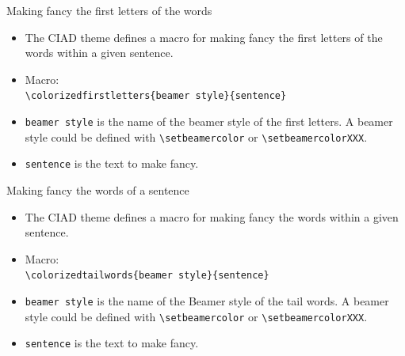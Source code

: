 \documentclass[english,sectioncirclenumberstyle]{ciadbeamer}
\begin{document}
\begin{frame}{Making fancy the first letters of the words}
	\begin{itemize}
	\item The CIAD theme defines a macro for making fancy the first letters of the words within a given sentence.
	\item Macro:\\
		\texttt{{\textbackslash}colorizedfirstletters\{beamer style\}\{sentence\}}
	\item \texttt{beamer style} is the name of the beamer style of the first letters. A beamer style could be defined with \texttt{{\textbackslash}setbeamercolor} or \texttt{{\textbackslash}setbeamercolorXXX}.
	\item \texttt{sentence} is the text to make fancy.
	\end{itemize}
	\begin{example}
	\end{example}
\end{frame}

\begin{frame}{Making fancy the words of a sentence}
	\begin{itemize}
	\item The CIAD theme defines a macro for making fancy the words within a given sentence.
	\item Macro:\\
		\texttt{{\textbackslash}colorizedtailwords\{beamer style\}\{sentence\}}
	\item \texttt{beamer style} is the name of the Beamer style of the tail words. A beamer style could be defined with \texttt{{\textbackslash}setbeamercolor} or \texttt{{\textbackslash}setbeamercolorXXX}.
	\item \texttt{sentence} is the text to make fancy.
	\end{itemize}
	\begin{example}
	\end{example}
\end{frame}
\end{document}
